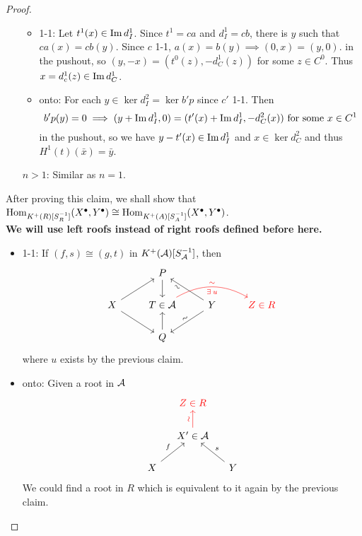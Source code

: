 \begin{theorem}
\begin{proof}
\begin{enumerate}
      \begin{itemize}
        \item 1-1: Let $t^1(x) \in \operatorname{Im} d^1_I$. Since $t^1 = ca$
          and $d^1_I = cb$, there is $y$ such that
          $ca(x) = cb(y)$. Since $c$ 1-1, $a(x) = b(y) \implies (0, x) = (y, 0)$.
          in the pushout, so $(y, -x) = (t^0(z), -d^1_C(z))$ for some $z \in C^0$.
          Thus $x = d^1_c(z) \in \operatorname{Im} d^1_C$.
        \item onto: For each $y \in \ker d_I^2 = \ker b'p$ since $c'$ 1-1.
          Then
          \[ b'p(y) = 0 \implies (y + \operatorname{Im} d^1_I, 0) = (t'(x) + \operatorname{Im} d^1_I, -d^2_C(x))
            \text{ for some } x \in C^1 \]
          in the pushout, so we have $y - t'(x) \in \operatorname{Im} d^1_I$ and
          $ x \in \ker d^2_C$ and thus $H^1(t)(\bar{x}) = \bar{y}$.
      \end{itemize}
    \item[$n > 1$:] Similar as $n = 1$.
    \end{enumerate}
    \medskip

    After proving this claim, we shall show that
    $\operatorname{Hom}_{K^+(R)[S_R^{-1}]}(X^\bullet, Y^\bullet)
    \cong \operatorname{Hom}_{K^+(A)[S^{-1}_A]}(X^\bullet, Y^\bullet)$. \\
    {\bf We will use left roofs instead of right roofs defined before here.}
    \begin{itemize}
      \item 1-1: If $(f, s) \cong (g, t)$ in $K^+(\mathcal{A})[S^{-1}_{\mathcal{A}}]$, then
        \[ \begin{tikzcd}
            & P \ar[d] & & \\
          X \ar[ru] \ar[rd] & T \in \Ac \ar[rr, bend left, "\sim", "\exists u"', sloped, red] &
          Y \ar[lu, "\sim"', sloped, near end] \ar[ld, "\sim", sloped] & {\color{red} Z \in R} \\
          & Q \ar[u] & &
        \end{tikzcd} \]
      where $u$ exists by the previous claim.
      \item onto: Given a root in $\mathcal{A}$
        \[ \begin{tikzcd}[column sep=small]
            & {\color{red} Z \in R} & \\
            & X' \in \Ac \ar[u, "\rotatebox{90}{\(\sim\)}", red] & \\
            X \ar[ru, "f"] & & Y \ar[lu, "s"']
        \end{tikzcd} \]
      We could find a root in $R$ which is equivalent to it again
      by the previous claim.
    \end{itemize}
  \end{proof}
\end{theorem}

